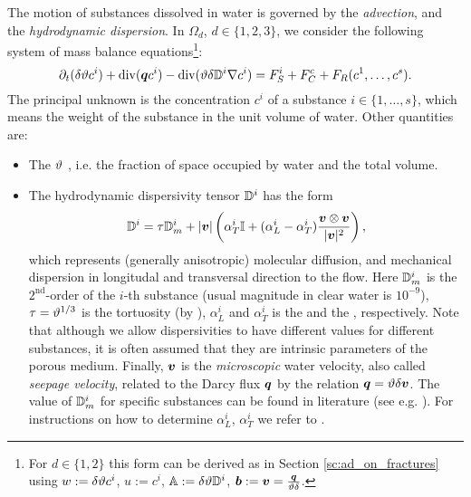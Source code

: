 The motion of substances dissolved in water is governed by the \emph{advection}, and the \emph{hydrodynamic dispersion}.
In $\Omega_d$, $d\in\{1,2,3\}$, we consider the following system of mass balance equations\footnote{For $d\in\{1,2\}$ this form can be derived as in Section \ref{sc:ad_on_fractures} using $w:=\delta\vartheta c^i$, $u:=c^i$, ${\mathbb{A}}:=\delta\vartheta{\mathbb{D}}^i$, $\mathbf{\boldsymbol{b}}:=\mathbf{\boldsymbol{v}}=\frac{\mathbf{\boldsymbol{q}}}{\vartheta\delta}$.}:
\begin{equation}
    \label{e:ADE}
   \partial_t ( \delta \th c^i) + \div ( \vc q c^i ) - \div (\th \delta \D^i \grad c^i ) = F_S^i + F^c_C + F_R(c^1,\dots, c^s).
\end{equation}
The principal unknown is the concentration $c^i$  of a substance $i\in\{1,\dots, s\}$, which means the weight of the substance in the unit volume of water.
Other quantities are:
\begin{itemize}
\item The  $\vartheta$ \units{}{}{}, i.e. the fraction of space occupied by water and the total volume.
\item The hydrodynamic dispersivity tensor ${{\mathbb{D}}}^i$  has the form
\begin{equation} 
  \label{eqn:transport_disp}
  \D^i =\tau \D_m^i + \abs{\vc v}\left(\alpha_T^i \tn I + (\alpha_L^i - \alpha_T^i) \frac{\vc v \otimes \vc v}{\abs{\vc v}^2}\right),
\end{equation}
which represents (generally anisotropic) molecular diffusion, and mechanical dispersion in longitudal and transversal direction to the flow.
Here ${{\mathbb{D}}}_m^i$  is the $2^{\text{nd}}$-order  of the $i$-th substance 
(usual magnitude in clear water is $10^{-9}$), $\tau=\vartheta^{1/3}$ is the tortuosity (by \cite{millington_quirk}), 
$\alpha_L^i$  and $\alpha_T^i$  is the  
and the , respectively.
Note that although we allow dispersivities to have different values for different substances, it is often assumed that they are intrinsic parameters
of the porous medium.
Finally, $\mathbf{\boldsymbol{v}}$  is the \emph{microscopic} water velocity, also called \emph{seepage velocity}, 
related to the Darcy flux $\mathbf{\boldsymbol{q}}$ by the relation $\mathbf{\boldsymbol{q}} = \vartheta\delta\mathbf{\boldsymbol{v}}$.
The value of ${{\mathbb{D}}}_m^i$ for specific substances can be found in literature (see e.g. \cite{cislerova_vogel}).
For instructions on how to determine $\alpha_L^i$, $\alpha_T^i$ we refer to \cite{marsily,domenico_schwartz}.


\end{itemize}

